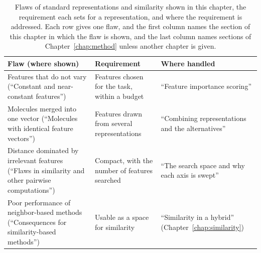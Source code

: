 \begin{table}[htbp]
\centering
\small
\begin{adjustbox}{max width=\textwidth}
\begin{tabular}{P{0.34\textwidth}P{0.30\textwidth}P{0.28\textwidth}}
\toprule
Flaw (where shown) & Requirement & Where handled \\
\midrule
Features that do not vary (``Constant and near-constant features'') & Features chosen for the task, within a budget & ``Feature importance scoring'' \\
Molecules merged into one vector (``Molecules with identical feature vectors'') & Features drawn from several representations & ``Combining representations and the alternatives'' \\
Distance dominated by irrelevant features (``Flaws in similarity and other pairwise computations'') & Compact, with the number of features searched & ``The search space and why each axis is swept'' \\
Poor performance of neighbor-based methods (``Consequences for similarity-based methods'') & Usable as a space for similarity & ``Similarity in a hybrid'' (Chapter~\ref{chap:similarity}) \\
\bottomrule
\end{tabular}
\end{adjustbox}
\caption[Flaws of standard representations and similarity, and the requirement each sets.]{Flaws of standard representations and similarity shown in this chapter, the requirement each sets for a representation, and where the requirement is addressed. Each row gives one flaw, and the first column names the section of this chapter in which the flaw is shown, and the last column names sections of Chapter~\ref{chap:method} unless another chapter is given.}
\label{tab:flaws:requirements}
\end{table}


